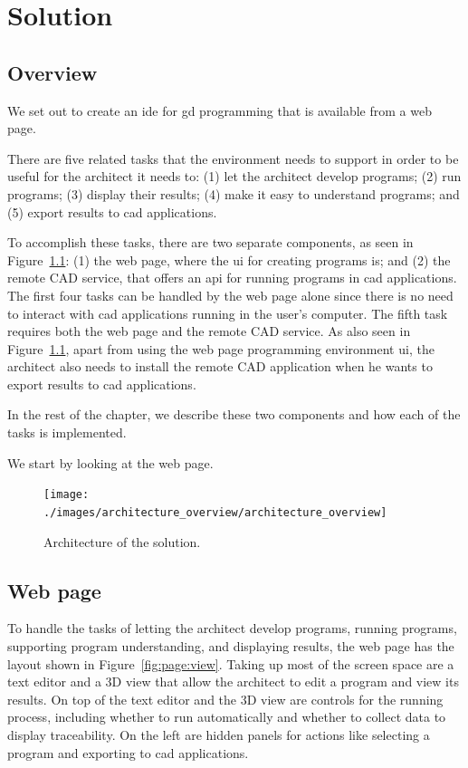 
\chapter{Solution}
\label{chapter:solution}


\section{Overview}
We set out to create an \gls{ide} for \gls{gd} programming that is available from a web page.

There are five related tasks that the environment needs to support in order to be useful for the architect it needs to:
(1) let the architect develop programs;
(2) run programs;
(3) display their results;
(4) make it easy to understand programs;
and (5) export results to \gls{cad} applications.

To accomplish these tasks, there are two separate components, as seen in Figure~\ref{fig:archi:sol}: (1) the web page, where the \gls{ui} for creating programs is; and (2) the remote CAD service, that offers an \gls{api} for running programs in \gls{cad} applications.
The first four tasks can be handled by the web page alone since there is no need to interact with \gls{cad} applications running in the user's computer.
The fifth task requires both the web page and the remote CAD service.
As also seen in Figure~\ref{fig:archi:sol}, apart from using the web page programming environment \gls{ui}, the architect also needs to install the remote CAD application when he wants to export results to \gls{cad} applications.

In the rest of the chapter, we describe these two components and how each of the tasks is implemented.

We start by looking at the web page.

\begin{figure}
  \centering
  \texttt{[image: ./images/architecture\_overview/architecture\_overview]}
  \caption{Architecture of the solution.}
  \label{fig:archi:sol}
\end{figure}


\section{Web page}
To handle the tasks of letting the architect develop programs, running programs, supporting program understanding, and displaying results, the web page has the layout shown in Figure~\ref{fig:page:view}.
Taking up most of the screen space are a text editor and a 3D view that allow the architect to edit a program and view its results.
On top of the text editor and the 3D view are controls for the running process, including whether to run automatically and whether to collect data to display traceability.
On the left are hidden panels for actions like selecting a program and exporting to \gls{cad} applications.

